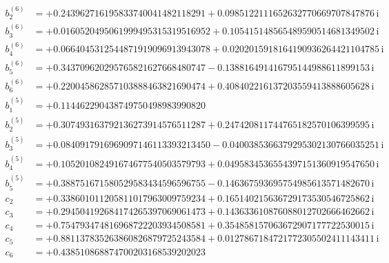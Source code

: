 {\begin{align*}
b^{(6)}_{2} &= +0.243962716195833740041482118291 + 0.0985122111652632770669707847876\,\mathrm{i}\\
b^{(6)}_{3} &= +0.0160520495061999495315319516952 + 0.105415148565489590514681349502\,\mathrm{i}\\
b^{(6)}_{4} &= +0.0664045312544871919096913943078 + 0.0202015918164190936264421104785\,\mathrm{i}\\
b^{(6)}_{5} &= +0.343709620295765821627668480747 - 0.138816491416795144988611899153\,\mathrm{i}\\
b^{(6)}_{6} &= +0.220045862857103888463821690474 + 0.408402216137203559413888605628\,\mathrm{i}\\[1mm]
b^{(5)}_{1} &= +0.114462290438749750498983990820\\
b^{(5)}_{2} &= +0.307493163792136273914576511287 + 0.247420811744765182570106399595\,\mathrm{i}\\
b^{(5)}_{3} &= +0.0840917916969097146113393213450 - 0.0400385366379295302130766035251\,\mathrm{i}\\
b^{(5)}_{4} &= +0.105201082491674677540503579793 + 0.0495834536554397151360919547650\,\mathrm{i}\\
b^{(5)}_{5} &= +0.388751671580529583434596596755 - 0.146367593695754985613571482670\,\mathrm{i}\\[1mm]
c_{2} &= +0.338601011205811017963009759234 + 0.165140215636729173530546725862\,\mathrm{i}\\
c_{3} &= +0.294504192684174265397069061473 + 0.143633610876088012702666462662\,\mathrm{i}\\
c_{4} &= +0.754793474816968722203934508581 + 0.354858157063672907177722530015\,\mathrm{i}\\
c_{5} &= +0.881137835263860826879725243584 + 0.0127867184721772305502411143411\,\mathrm{i}\\
c_{6} &= +0.438510868874700203168539202023
\end{align*}
}

